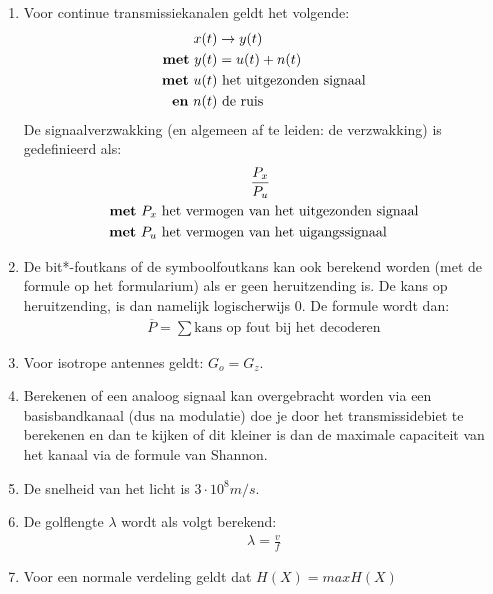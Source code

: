 \documentclass[12pt,a4paper]{article}
\begin{document}
\begin{enumerate}
	\item Voor continue transmissiekanalen geldt het volgende:
	      \begin{align*}
	      	x(t)                      & \rightarrow y(t)                \\
	      	\text{\textbf{met} } y(t) & = u(t) + n(t)                   \\
	      	\text{\textbf{met} } u(t) & \text{ het uitgezonden signaal} \\
	      	\text{\textbf{en} } n(t)  & \text{ de ruis}                 
	      \end{align*}
	      De signaalverzwakking (en algemeen af te leiden: de verzwakking) is gedefinieerd als:
	      \begin{align*}
	      	\frac{P_x}{P_u}                                   &                                 \\
	      	\text{\textbf{met} } P_x \text{ het vermogen van} & \text{ het uitgezonden signaal} \\
	      	\text{\textbf{met} } P_u \text{ het vermogen van} & \text{ het uigangssignaal}\     
	      \end{align*}
	      
	\item De bit*-foutkans of de symboolfoutkans kan ook berekend worden (met de formule op het formularium) als er geen heruitzending is. De kans op heruitzending, is dan namelijk logischerwijs $0$.
	      De formule wordt dan:
	      \begin{align*}
	      	\overline{P} = \sum\text{kans op fout bij het decoderen} 
	      \end{align*}
	      
	\item Voor isotrope antennes geldt: $G_o = G_z$.
	      
	\item Berekenen of een analoog signaal kan overgebracht worden via een basisbandkanaal (dus na modulatie) doe je door het transmissidebiet te berekenen en dan te kijken of dit kleiner is dan de maximale capaciteit van het kanaal via de formule van Shannon.
	      
	\item De snelheid van het licht is $3 \cdot 10^8 m/s$.
	      
	\item De golflengte $\lambda$ wordt als volgt berekend:
	      \begin{align*}
	      	\lambda = \frac{v}{f} 
	      \end{align*}
	      
	\item Voor een normale verdeling geldt dat $H(X) = max H(X)$
	      
	      
\end{enumerate}
\end{document}
